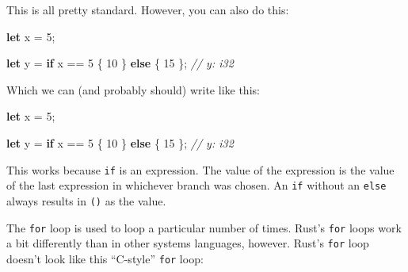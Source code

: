 \documentclass[a4paper,]{book}
\newenvironment{Shaded}{\begin{snugshade}}{\end{snugshade}}
\newcommand{\KeywordTok}[1]{\textcolor[rgb]{0.13,0.29,0.53}{\textbf{{#1}}}}
\newcommand{\DecValTok}[1]{\textcolor[rgb]{0.00,0.00,0.81}{{#1}}}
\newcommand{\CharTok}[1]{\textcolor[rgb]{0.31,0.60,0.02}{{#1}}}
\newcommand{\StringTok}[1]{\textcolor[rgb]{0.31,0.60,0.02}{{#1}}}
\newcommand{\CommentTok}[1]{\textcolor[rgb]{0.56,0.35,0.01}{\textit{{#1}}}}
\newcommand{\NormalTok}[1]{{#1}}
\begin{document}
This is all pretty standard. However, you can also do this:

\begin{Shaded}
\begin{Highlighting}[]
\KeywordTok{let} \NormalTok{x = }\DecValTok{5}\NormalTok{;}

\KeywordTok{let} \NormalTok{y = }\KeywordTok{if} \NormalTok{x == }\DecValTok{5} \NormalTok{\{}
    \DecValTok{10}
\NormalTok{\} }\KeywordTok{else} \NormalTok{\{}
    \DecValTok{15}
\NormalTok{\}; }\CommentTok{// y: i32}
\end{Highlighting}
\end{Shaded}

Which we can (and probably should) write like this:

\begin{Shaded}
\begin{Highlighting}[]
\KeywordTok{let} \NormalTok{x = }\DecValTok{5}\NormalTok{;}

\KeywordTok{let} \NormalTok{y = }\KeywordTok{if} \NormalTok{x == }\DecValTok{5} \NormalTok{\{ }\DecValTok{10} \NormalTok{\} }\KeywordTok{else} \NormalTok{\{ }\DecValTok{15} \NormalTok{\}; }\CommentTok{// y: i32}
\end{Highlighting}
\end{Shaded}

This works because \texttt{if} is an expression. The value of the
expression is the value of the last expression in whichever branch was
chosen. An \texttt{if} without an \texttt{else} always results in
\texttt{()} as the value.


The \texttt{for} loop is used to loop a particular number of times.
Rust's \texttt{for} loops work a bit differently than in other systems
languages, however. Rust's \texttt{for} loop doesn't look like this
``C-style'' \texttt{for} loop:

\begin{Shaded}
\end{Shaded}
\end{document}
